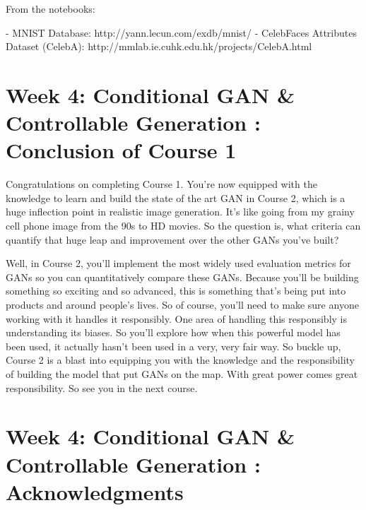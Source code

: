 \documentclass[11pt, onecolumn]{article}
\begin{document}
From the notebooks:

- MNIST Database: http://yann.lecun.com/exdb/mnist/
- CelebFaces Attributes Dataset (CelebA): http://mmlab.ie.cuhk.edu.hk/projects/CelebA.html

\section{Week 4: Conditional GAN \& Controllable Generation : Conclusion of Course 1}

Congratulations on completing Course 1. You're now equipped with the knowledge to learn and build the state of the art GAN in Course 2,
which is a huge inflection point in realistic image generation. It’s like going from my grainy cell phone image from the 90s to HD movies.
So the question is, what criteria can quantify that huge leap and improvement over the other GANs you've built?

Well, in Course 2, you'll implement the most widely used evaluation metrics for GANs so you can quantitatively compare these GANs. Because you'll be building something so exciting and so advanced, this is something that's being put into products and around people's lives. So of course, you'll need to make sure anyone working with it handles it responsibly. One area of handling this responsibly is understanding its biases. So you'll explore how when this powerful model has been used, it actually hasn't been used in a very, very fair way. So buckle up, Course 2 is a blast into equipping you with the knowledge and the responsibility of building the model that put GANs on the map. With great power comes great responsibility. So see you in the next course. 

\section{Week 4: Conditional GAN \& Controllable Generation : Acknowledgments}
\end{document}
